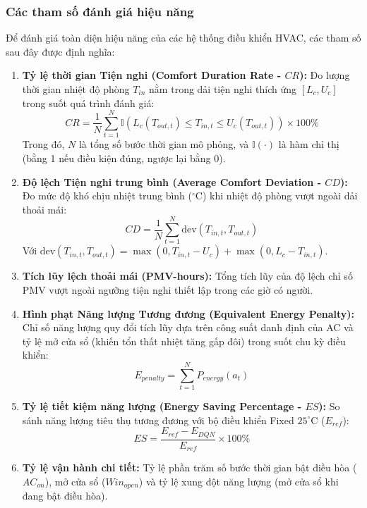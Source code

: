 \documentclass[12pt, a4paper]{article}
\begin{document}
\subsubsection{Các tham số đánh giá hiệu năng}
Để đánh giá toàn diện hiệu năng của các hệ thống điều khiển HVAC, các tham số sau đây được định nghĩa:
\begin{enumerate}
    \item \textbf{Tỷ lệ thời gian Tiện nghi (Comfort Duration Rate - $CR$):} Đo lượng thời gian nhiệt độ phòng $T_{in}$ nằm trong dải tiện nghi thích ứng $[L_c, U_c]$ trong suốt quá trình đánh giá:
    \begin{equation}
    CR = \frac{1}{N} \sum_{t=1}^{N} \mathbb{I}\left( L_c(T_{out, t}) \le T_{in, t} \le U_c(T_{out, t}) \right) \times 100\%
    \end{equation}
    Trong đó, $N$ là tổng số bước thời gian mô phỏng, và $\mathbb{I}(\cdot)$ là hàm chỉ thị (bằng 1 nếu điều kiện đúng, ngược lại bằng 0).
    \item \textbf{Độ lệch Tiện nghi trung bình (Average Comfort Deviation - $CD$):} Đo mức độ khó chịu nhiệt trung bình ($^\circ\text{C}$) khi nhiệt độ phòng vượt ngoài dải thoải mái:
    \begin{equation}
    CD = \frac{1}{N} \sum_{t=1}^{N} \text{dev}(T_{in, t}, T_{out, t})
    \end{equation}
    Với $\text{dev}(T_{in, t}, T_{out, t}) = \max(0, T_{in, t} - U_c) + \max(0, L_c - T_{in, t})$.
    \item \textbf{Tích lũy lệch thoải mái (PMV-hours):} Tổng tích lũy của độ lệch chỉ số PMV vượt ngoài ngưỡng tiện nghi thiết lập trong các giờ có người.
    \item \textbf{Hình phạt Năng lượng Tương đương (Equivalent Energy Penalty):} Chỉ số năng lượng quy đổi tích lũy dựa trên công suất danh định của AC và tỷ lệ mở cửa sổ (khiến tổn thất nhiệt tăng gấp đôi) trong suốt chu kỳ điều khiển:
    \begin{equation}
    E_{penalty} = \sum_{t=1}^{N} P_{energy}(a_t)
    \end{equation}
    \item \textbf{Tỷ lệ tiết kiệm năng lượng (Energy Saving Percentage - $ES$):} So sánh năng lượng tiêu thụ tương đương với bộ điều khiển Fixed $25^\circ\text{C}$ ($E_{ref}$):
    \begin{equation}
    ES = \frac{E_{ref} - E_{DQN}}{E_{ref}} \times 100\%
    \end{equation}
    \item \textbf{Tỷ lệ vận hành chi tiết:} Tỷ lệ phần trăm số bước thời gian bật điều hòa ($AC_{on}$), mở cửa sổ ($Win_{open}$) và tỷ lệ xung đột năng lượng (mở cửa sổ khi đang bật điều hòa).
\end{enumerate}
\end{document}
